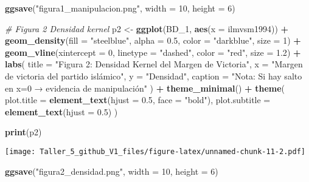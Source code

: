 \documentclass[
]{article}
\newenvironment{Shaded}{\begin{snugshade}}{\end{snugshade}}
\newcommand{\AttributeTok}[1]{\textcolor[rgb]{0.13,0.29,0.53}{#1}}
\newcommand{\CommentTok}[1]{\textcolor[rgb]{0.56,0.35,0.01}{\textit{#1}}}
\newcommand{\DecValTok}[1]{\textcolor[rgb]{0.00,0.00,0.81}{#1}}
\newcommand{\FloatTok}[1]{\textcolor[rgb]{0.00,0.00,0.81}{#1}}
\newcommand{\FunctionTok}[1]{\textcolor[rgb]{0.13,0.29,0.53}{\textbf{#1}}}
\newcommand{\NormalTok}[1]{#1}
\newcommand{\OtherTok}[1]{\textcolor[rgb]{0.56,0.35,0.01}{#1}}
\newcommand{\SpecialCharTok}[1]{\textcolor[rgb]{0.81,0.36,0.00}{\textbf{#1}}}
\newcommand{\StringTok}[1]{\textcolor[rgb]{0.31,0.60,0.02}{#1}}
\begin{document}
\begin{Shaded}
\begin{Highlighting}[]
\FunctionTok{ggsave}\NormalTok{(}\StringTok{"figura1\_manipulacion.png"}\NormalTok{, }\AttributeTok{width =} \DecValTok{10}\NormalTok{, }\AttributeTok{height =} \DecValTok{6}\NormalTok{)}

\CommentTok{\# Figura 2 Densidad kernel}
\NormalTok{p2 }\OtherTok{\textless{}{-}} \FunctionTok{ggplot}\NormalTok{(BD\_1, }\FunctionTok{aes}\NormalTok{(}\AttributeTok{x =}\NormalTok{ ilmvsm1994)) }\SpecialCharTok{+}
  \FunctionTok{geom\_density}\NormalTok{(}\AttributeTok{fill =} \StringTok{"steelblue"}\NormalTok{, }\AttributeTok{alpha =} \FloatTok{0.5}\NormalTok{, }\AttributeTok{color =} \StringTok{"darkblue"}\NormalTok{, }\AttributeTok{size =} \DecValTok{1}\NormalTok{) }\SpecialCharTok{+}
  \FunctionTok{geom\_vline}\NormalTok{(}\AttributeTok{xintercept =} \DecValTok{0}\NormalTok{, }\AttributeTok{linetype =} \StringTok{"dashed"}\NormalTok{, }\AttributeTok{color =} \StringTok{"red"}\NormalTok{, }\AttributeTok{size =} \FloatTok{1.2}\NormalTok{) }\SpecialCharTok{+}
  \FunctionTok{labs}\NormalTok{(}
    \AttributeTok{title =} \StringTok{"Figura 2: Densidad Kernel del Margen de Victoria"}\NormalTok{,}
    \AttributeTok{x =} \StringTok{"Margen de victoria del partido islámico"}\NormalTok{,}
    \AttributeTok{y =} \StringTok{"Densidad"}\NormalTok{,}
    \AttributeTok{caption =} \StringTok{"Nota: Si hay salto en x=0 → evidencia de manipulación"}
\NormalTok{  ) }\SpecialCharTok{+}
  \FunctionTok{theme\_minimal}\NormalTok{() }\SpecialCharTok{+} 
    \FunctionTok{theme}\NormalTok{(}
    \AttributeTok{plot.title =} \FunctionTok{element\_text}\NormalTok{(}\AttributeTok{hjust =} \FloatTok{0.5}\NormalTok{, }\AttributeTok{face =} \StringTok{"bold"}\NormalTok{),}
    \AttributeTok{plot.subtitle =} \FunctionTok{element\_text}\NormalTok{(}\AttributeTok{hjust =} \FloatTok{0.5}\NormalTok{)}
\NormalTok{  )}

\FunctionTok{print}\NormalTok{(p2)}
\end{Highlighting}
\end{Shaded}

\texttt{[image: Taller\_5\_github\_V1\_files/figure-latex/unnamed-chunk-11-2.pdf]}

\begin{Shaded}
\begin{Highlighting}[]
\FunctionTok{ggsave}\NormalTok{(}\StringTok{"figura2\_densidad.png"}\NormalTok{, }\AttributeTok{width =} \DecValTok{10}\NormalTok{, }\AttributeTok{height =} \DecValTok{6}\NormalTok{)}
\end{Highlighting}
\end{Shaded}
\end{document}
